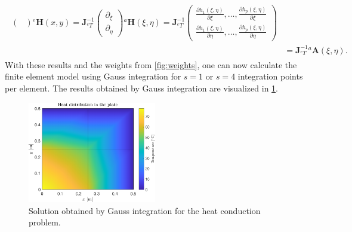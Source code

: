 \documentclass[a4paper,11pt]{article}
\numberwithin{equation}{section}
\newcommand\matr[1]{\ensuremath{\boldsymbol{\mathbf{#1}}}}
\newcommand\vect[1]{\ensuremath{\bm{#1}}}
\begin{document}
{\begin{align}
\begin{aligned}
\begin{pmatrix}
		\end{pmatrix} {}^e\vect{H}(x,y) =  \matr{J}_{{}^e T}^{-1}\begin{pmatrix}
			\partial_\xi \\ \partial_\eta
		\end{pmatrix}{}^a \vect{H}(\xi,\eta) = \matr{J}_{{}^e T}^{-1} \begin{pmatrix}
			\frac{\partial h_1(\xi,\eta)}{\partial \xi},\dots,\frac{\partial h_p(\xi,\eta)}{\partial \xi} \\
			\frac{\partial h_1(\xi,\eta)}{\partial \eta},\dots,\frac{\partial h_p(\xi,\eta)}{\partial \eta}
		\end{pmatrix} \\
		&= \matr{J}_{{}^e T}^{-1}{}^a \matr{A}(\xi,\eta).
\end{aligned}\end{align} With these results and the weights from \cref{fig:weights}, one can now calculate the finite element model using Gauss integration for $s=1$ or $s=4$ integration points per element. The results obtained by Gauss integration are visualized in \cref{fig:distribution}.
\begin{figure}[h]
	\centering
	\includegraphics[width=0.5\textwidth]{figures/distribution.pdf}
	\caption{Solution obtained by Gauss integration for the heat conduction problem.}
	\label{fig:distribution}
\end{figure}
} 
\end{document}
